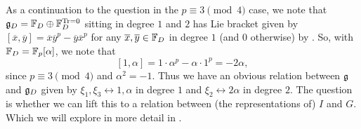\begin{remark}
  As a continuation to the question in the $p \equiv 3 \pmod{4}$ case, we note that $\mathfrak{g}_{D} = \mathbb{F}_{D} \oplus \mathbb{F}_{D}^{\operatorname{Tr} = 0}$ sitting in degree $1$ and $2$ has Lie bracket given by $[\overline{x},\overline{y}] = \overline{x}\overline{y}^{p} - \overline{y}\overline{x}^{p}$ for any $\overline{x},\overline{y} \in \mathbb{F}_{D}$ in degree $1$ (and $0$ otherwise) by \cite[(6.6)]{Sor}. So, with $\mathbb{F}_{D} = \mathbb{F}_{p}[\alpha]$, we note that
  \[
    [1,\alpha] = 1\cdot\alpha^{p} - \alpha\cdot1^{p} = -2\alpha,
  \]
  since $p \equiv 3 \pmod{4}$ and $\alpha^{2} = -1$. Thus we have an obvious relation between $\mathfrak{g}$ and $\mathfrak{g}_{D}$ given by $\xi_{1},\xi_{3} \leftrightarrow 1,\alpha$ in degree $1$ and $\xi_{2} \leftrightarrow 2\alpha$ in degree $2$. The question is whether we can lift this to a relation between (the representations of) $I$ and $G$. Which we will explore in more detail in .
\end{remark}



